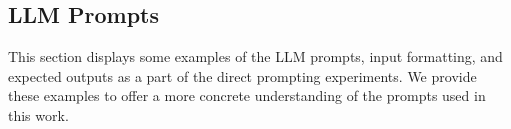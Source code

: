 \subsection{LLM Prompts}
\label{sec:llmPrompts}
This section displays some examples of the LLM prompts, input formatting, and expected outputs as a part of the direct prompting experiments.
We provide these examples to offer a more concrete understanding of the prompts used in this work.






